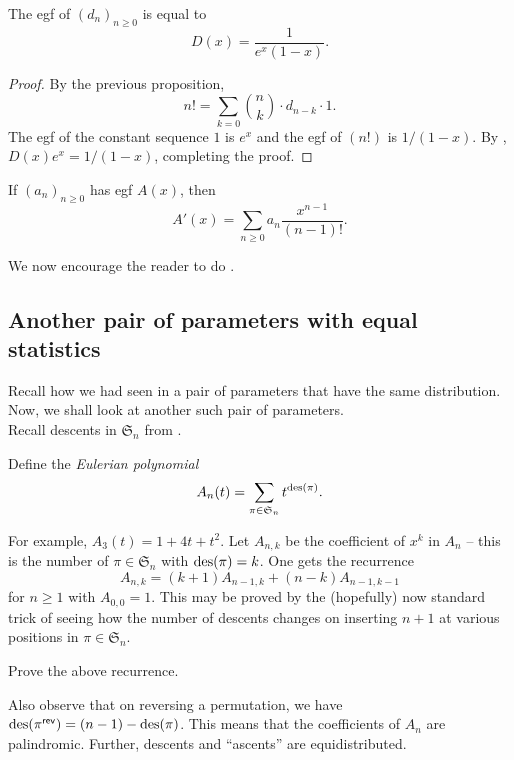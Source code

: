 	\begin{fcor}
		The egf of $(d_n)_{n \ge 0}$ is equal to 
		\[ D(x) = \frac{1}{e^x(1-x)}. \]
	\end{fcor}
	\begin{proof}
		By the previous proposition,
		\[ n! = \sum_{k = 0} \binom{n}{k} \cdot d_{n-k} \cdot 1. \]
		The egf of the constant sequence $1$ is $e^x$ and the egf of $(n!)$ is $1/(1-x)$. By , $D(x) e^x = 1/(1-x)$, completing the proof.
	\end{proof}


	\begin{prop}
		If $(a_n)_{n \ge 0}$ has egf $A(x)$, then
		\[ A'(x) = \sum_{n \ge 0} a_n \frac{x^{n-1}}{(n-1)!}. \]
	\end{prop}

	We now encourage the reader to do .\\

\subsection{Another pair of parameters with equal statistics}

	Recall how we had seen in  a pair of parameters that have the same distribution. Now, we shall look at another such pair of parameters.\\
	Recall descents in $\mathfrak{S}_n$ from .\\
	\begin{fdef}
		\label{def: eulerian poly}
		Define the \emph{Eulerian polynomial}
		\begin{equation}
			A_n(t) = \sum_{\pi \in \mathfrak{S}_n} t^{\operatorname{des}(\pi)}. \label{eulerian polynomial}
		\end{equation}
	\end{fdef}
	For example, $A_3(t) = 1+4t+t^2$. Let $A_{n,k}$ be the coefficient of $x^k$ in $A_n$ -- this is the number of $\pi \in \mathfrak{S}_n$ with $\operatorname{des}(\pi) = k$. One gets the recurrence
	\[ A_{n,k} = (k+1)A_{n-1,k} + (n-k)A_{n-1,k-1} \]
	for $n \ge 1$ with $A_{0,0} = 1$. This may be proved by the (hopefully) now standard trick of seeing how the number of descents changes on inserting $n+1$ at various positions in $\pi \in \mathfrak{S}_n$.\\

	\begin{exercise}
		Prove the above recurrence.
	\end{exercise}
	Also observe that on reversing a permutation, we have $\operatorname{des}(\pi^\mathsf{rev}) = (n-1) - \operatorname{des}(\pi)$. This means that the coefficients of $A_n$ are palindromic. Further, descents and ``ascents'' are equidistributed.


